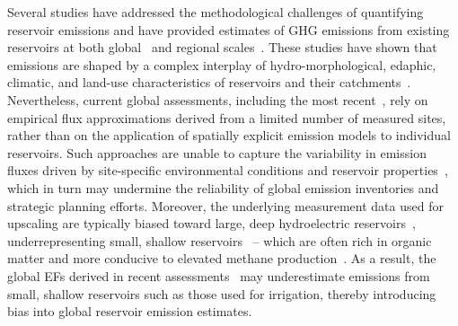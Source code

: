 \documentclass[final,1p,times]{elsarticle}
\begin{document}

Several studies have addressed the methodological challenges of quantifying reservoir emissions and have provided estimates of \ac{GHG} emissions from existing reservoirs at both global~\citep{Barros2011, Soued2022, Deemer2016, Prairie2018, Harrison2021} and regional scales~\citep{Hidrovo2017, Rasanen2018, Almeida2019, Hansen2022}. 
These studies have shown that emissions are shaped by a complex interplay of hydro-morphological, edaphic, climatic, and land-use characteristics of reservoirs and their catchments~\citep{Deemer2016, Prairie2021}.
Nevertheless, current global assessments, including the most recent~\citep{Harrison2021, Soued2022}, rely on empirical flux approximations derived from a limited number of measured sites, rather than on the application of spatially explicit emission models to individual reservoirs.
Such approaches are unable to capture the variability in emission fluxes driven by site-specific environmental conditions and reservoir properties~\citep{janus2025planning}, which in turn may undermine the reliability of global emission inventories and strategic planning efforts. 
Moreover, the underlying measurement data used for upscaling are typically biased toward large, deep hydroelectric reservoirs~\citep{Hansen2022}, underrepresenting small, shallow reservoirs~\citep{Malerba2022} -- which are often rich in organic matter and more conducive to elevated methane production~\citep{WANG2025123441, SHI2025}. 
As a result, the global \acp{EF} derived in recent assessments~\citep{Harrison2021, Soued2022} may underestimate emissions from small, shallow reservoirs such as those used for irrigation, thereby introducing bias into global reservoir emission estimates.
\end{document}
